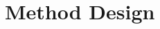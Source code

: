 \documentclass[acmsmall,screen,review,anonymous]{acmart} %
\begin{document}







\section{Method Design}
\end{document}
